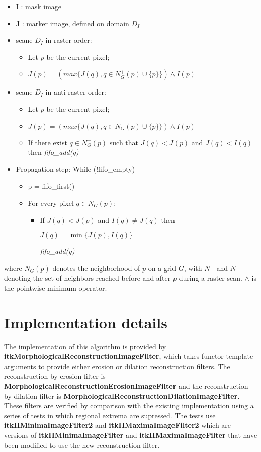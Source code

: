 \documentclass{InsightArticle}
\begin{document}
\begin{itemize}
\item I : mask image
\item J : marker image, defined on domain $D_I$
\item scane $D_I$ in raster order:
   \begin{itemize}
	\item Let $p$ be the current pixel;
	\item $J(p) = (max\{J(q), q \in N^+_G(p) \cup \{p\}\}) \wedge I(p)$
   \end{itemize}
\item scane $D_I$ in anti-raster order:
   \begin{itemize}
	\item Let $p$ be the current pixel;
	\item $J(p) = (max\{J(q), q \in N^-_G(p) \cup \{p\}\}) \wedge I(p)$
	\item If there exist $q \in  N^-_G(p)$ such that $J(q) < J(p)$ and $J(q) < I(q)$ then {\em fifo\_add(q)}
   \end{itemize}
\item Propagation step: While (!fifo\_empty)
   \begin{itemize}
	\item p = fifo\_first()
        \item For every pixel $q \in N_G(p)$:
        \begin{itemize}
	\item If $J(q) < J(p)$ and $I(q) \ne J(q)$ then

	      $J(q) = \min\{J(p),I(q)\}$

         	{\em fifo\_add(q)}
		
	\end{itemize}
   \end{itemize}
\end{itemize}

where $N_G(p)$ denotes the neighborhood of $p$ on a grid $G$, with
$N^+$ and $N^-$ denoting the set of neighbors reached before and after
$p$ during a raster scan. $\wedge$ is the pointwise minimum operator.
\section{Implementation details}
The implementation of this algorithm is provided by {\bf
itkMorphologicalReconstructionImageFilter}, which takes functor
template arguments to provide either erosion or dilation
reconstruction filters. The reconstruction by erosion filter is {\bf
MorphologicalReconstructionErosionImageFilter} and the reconstruction
by dilation filter is {\bf
MorphologicalReconstructionDilationImageFilter}. These filters are
verified by comparison with the existing implementation using a series
of tests in which regional extrema are supressed. The tests use {\bf
itkHMinimaImageFilter2} and {\bf itkHMaximaImageFilter2} which are
versions of {\bf itkHMinimaImageFilter} and {\bf
itkHMaximaImageFilter} that have been modified to use the new
reconstruction filter.
\end{document}
